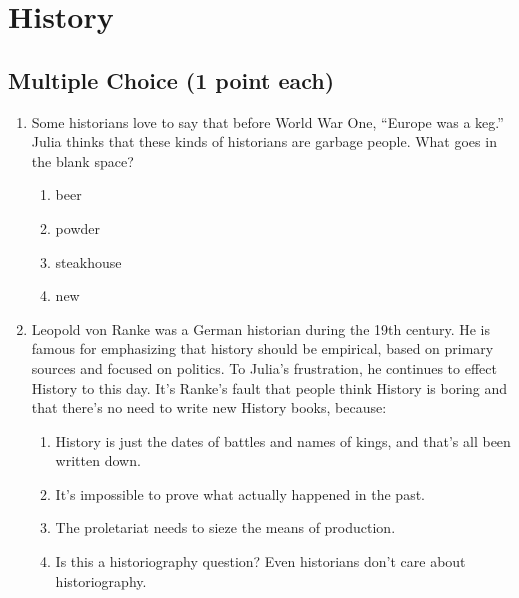 \documentclass[11pt]{exam}
\begin{document}
\begin{questions}
\begin{enumerate}
\end{enumerate}





\newpage
\section{History}

\subsection{Multiple Choice (1 point each)}

\begin{enumerate}



\item Some historians love to say that before World War One, ``Europe was a
\underline{\hspace{2cm}} keg.'' Julia thinks that these kinds of historians
are garbage people. What goes in the blank space?
\begin{enumerate}
\item beer
\item powder
\item steakhouse
\item new
\end{enumerate}




\item Leopold von Ranke was a German historian during the 19th century. He is famous for
emphasizing that history should be empirical, based on primary sources and focused on politics. To Julia's frustration, he continues to effect History to this day.
It’s Ranke's fault that people think History is boring and that there’s no need to write new History books, because:

\begin{enumerate}
\item History is just the dates of battles and names of kings, and that’s all been written down.
\item It’s impossible to prove what actually happened in the past.
\item The proletariat needs to sieze the means of production.
\item Is this a historiography question? Even historians don’t care about historiography.
\end{enumerate}





\end{enumerate}
\end{questions}
\end{document}
